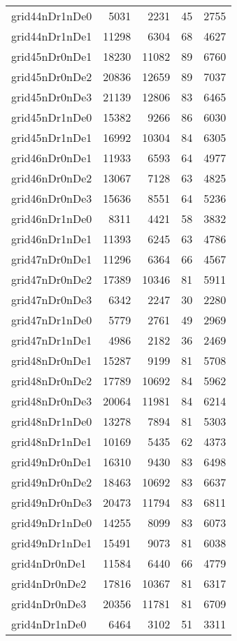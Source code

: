 \begin{longtable}{lrrrr}
grid44nDr1nDe0 & 5031 & 2231 & 45 & 2755 \\
grid44nDr1nDe1 & 11298 & 6304 & 68 & 4627 \\
grid45nDr0nDe1 & 18230 & 11082 & 89 & 6760 \\
grid45nDr0nDe2 & 20836 & 12659 & 89 & 7037 \\
grid45nDr0nDe3 & 21139 & 12806 & 83 & 6465 \\
grid45nDr1nDe0 & 15382 & 9266 & 86 & 6030 \\
grid45nDr1nDe1 & 16992 & 10304 & 84 & 6305 \\
grid46nDr0nDe1 & 11933 & 6593 & 64 & 4977 \\
grid46nDr0nDe2 & 13067 & 7128 & 63 & 4825 \\
grid46nDr0nDe3 & 15636 & 8551 & 64 & 5236 \\
grid46nDr1nDe0 & 8311 & 4421 & 58 & 3832 \\
grid46nDr1nDe1 & 11393 & 6245 & 63 & 4786 \\
grid47nDr0nDe1 & 11296 & 6364 & 66 & 4567 \\
grid47nDr0nDe2 & 17389 & 10346 & 81 & 5911 \\
grid47nDr0nDe3 & 6342 & 2247 & 30 & 2280 \\
grid47nDr1nDe0 & 5779 & 2761 & 49 & 2969 \\
grid47nDr1nDe1 & 4986 & 2182 & 36 & 2469 \\
grid48nDr0nDe1 & 15287 & 9199 & 81 & 5708 \\
grid48nDr0nDe2 & 17789 & 10692 & 84 & 5962 \\
grid48nDr0nDe3 & 20064 & 11981 & 84 & 6214 \\
grid48nDr1nDe0 & 13278 & 7894 & 81 & 5303 \\
grid48nDr1nDe1 & 10169 & 5435 & 62 & 4373 \\
grid49nDr0nDe1 & 16310 & 9430 & 83 & 6498 \\
grid49nDr0nDe2 & 18463 & 10692 & 83 & 6637 \\
grid49nDr0nDe3 & 20473 & 11794 & 83 & 6811 \\
grid49nDr1nDe0 & 14255 & 8099 & 83 & 6073 \\
grid49nDr1nDe1 & 15491 & 9073 & 81 & 6038 \\
grid4nDr0nDe1 & 11584 & 6440 & 66 & 4779 \\
grid4nDr0nDe2 & 17816 & 10367 & 81 & 6317 \\
grid4nDr0nDe3 & 20356 & 11781 & 81 & 6709 \\
grid4nDr1nDe0 & 6464 & 3102 & 51 & 3311 \\

\end{longtable}
